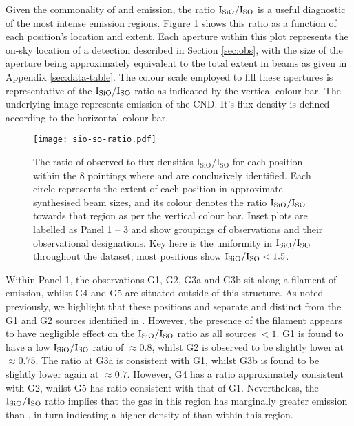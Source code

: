\documentclass[twocolumn]{aastex631}
\begin{document}
Given the commonality of  and  emission, the ratio $\mathrm{I}_{\ce{SiO}}/\mathrm{I}_{\ce{SO}}$ is a useful diagnostic of the most intense emission regions. Figure \ref{fig:sio-so-ratio} shows this ratio as a function of each position's location and extent. Each aperture within this plot represents the on-sky location of a detection described in Section \ref{sec:obs}, with the size of the aperture being approximately equivalent to the total extent in beams as given in Appendix \ref{sec:data-table}. The colour scale employed to fill these apertures is representative of the $\mathrm{I}_{\ce{SiO}}/\mathrm{I}_{\ce{SO}}$ ratio as indicated by the vertical colour bar. The underlying image represents  emission of the CND. It's flux density is defined according to the horizontal colour bar.

\begin{figure*}
    \centering
    \texttt{[image: sio-so-ratio.pdf]}
    \caption{The ratio of observed  to  flux densities $\mathrm{I_{SiO}/I_{SO}}$ for each position within the 8 pointings where  and  are conclusively identified. Each circle represents the extent of each position in approximate synthesised beam sizes, and its colour denotes the ratio $\mathrm{I_{\ce{SiO}}/I_{\ce{SO}}}$ towards that region as per the vertical colour bar. Inset plots are labelled as Panel 1 -- 3 and show groupings of observations and their observational designations. Key here is the uniformity in $\mathrm{I_{\ce{SiO}}/I_{\ce{SO}}}$ throughout the dataset; most positions show $\mathrm{I_{\ce{SiO}}/I_{\ce{SO}}} < 1.5$.}
    \label{fig:sio-so-ratio}
\end{figure*}

Within Panel 1, the observations G1, G2, G3a and G3b sit along a filament of  emission, whilst G4 and G5 are situated outside of this structure. As noted previously, we highlight that these positions and separate and distinct from the G1 and G2 sources identified in \citet{dustEnshroudedSources}. However, the presence of the filament appears to have negligible effect on the $\mathrm{I}_{\ce{SiO}}/\mathrm{I}_{\ce{SO}}$ ratio as all sources $< 1$. G1 is found to have a low $\mathrm{I}_{\ce{SiO}}/\mathrm{I}_{\ce{SO}}$ ratio of $\approx 0.8$, whilst G2 is observed to be slightly lower at $\approx 0.75$. The ratio at G3a is consistent with G1, whilst G3b is found to be slightly lower again at $\approx 0.7$. However, G4 has a ratio approximately consistent with G2, whilst G5 has ratio consistent with that of G1. Nevertheless, the $\mathrm{I}_{\ce{SiO}}/\mathrm{I}_{\ce{SO}}$ ratio implies that the gas in this region has marginally greater  emission than , in turn indicating a higher density of  than  within this region. 
\end{document}
